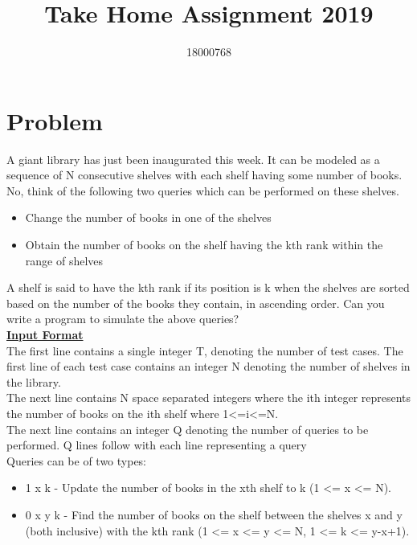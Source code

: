 \documentclass[a4paper,12pt]{article}
\begin{document}
\title{Take Home Assignment 2019}

\author{18000768}

\maketitle

\section*{Problem}
    A giant library has just been inaugurated this week. It can be modeled as a sequence of N consecutive shelves with each shelf having some number of books. No, think of the following two queries which can be performed on these shelves.
    \begin{itemize}
        \item Change the number of books in one of the shelves
        \item Obtain the number of books on the shelf having the kth rank within the range of shelves
    \end{itemize}
    A shelf is said to have the kth rank if its position is k when the shelves are sorted based on the number of the books they contain, in ascending order. Can you write a program to simulate the above queries?
   \\ \underline{\textbf{Input Format} }
    \\The first line contains a single integer T, denoting the number of test cases. The first line of each test case contains an integer N denoting the number of shelves in the library.\\
The next line contains N space separated integers where the ith integer represents the number of books on the ith shelf where 1\textless=i\textless=N.\\
The next line contains an integer Q denoting the number of queries to be performed. Q lines follow with each line representing a query\\
Queries can be of two types:
\begin{itemize}
    \item 1 x k - Update the number of books in the xth shelf to k (1 \textless= x \textless= N).
    \item 0 x y k - Find the number of books on the shelf between the shelves x and y (both inclusive) with the kth rank (1 \textless= x \textless= y \textless= N, 1 \textless= k \textless= y-x+1).
\end{itemize}
\end{document}
